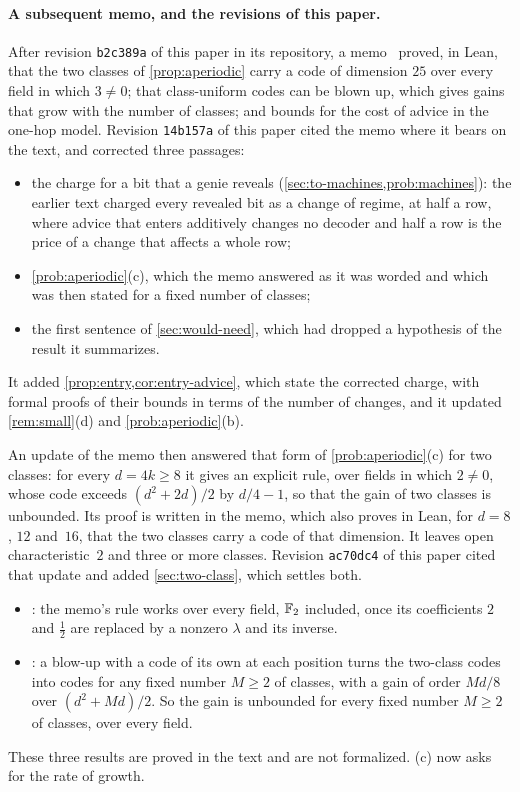 \paragraph{A subsequent memo, and the revisions of this paper.} After revision \texttt{b2c389a} of this paper in its
repository, a memo~\cite{ClassUniformMemo2026} proved, in Lean, that the two classes of \cref{prop:aperiodic} carry a
code of dimension $25$ over every field in which $3\ne0$; that class-uniform codes can be blown up, which gives gains
that grow with the number of classes; and bounds for the cost of advice in the one-hop model. Revision
\texttt{14b157a} of this paper cited the memo where it bears on the text, and corrected three passages:
\begin{itemize}[leftmargin=1.5em]
\item the charge for a bit that a genie reveals (\cref{sec:to-machines,prob:machines}): the earlier text charged every
revealed bit as a change of regime, at half a row, where advice that enters additively changes no decoder and half a
row is the price of a change that affects a whole row;
\item \cref{prob:aperiodic}(c), which the memo answered as it was worded and which was then stated for a fixed number
of classes;
\item the first sentence of \cref{sec:would-need}, which had dropped a hypothesis of the result it summarizes.
\end{itemize}
It added \cref{prop:entry,cor:entry-advice}, which state the corrected charge, with formal proofs of their bounds in
terms of the number of changes, and it updated \cref{rem:small}(d) and \cref{prob:aperiodic}(b).

An update of the memo then answered that form of \cref{prob:aperiodic}(c) for two classes: for every $d=4k\ge8$ it
gives an explicit rule, over fields in which $2\ne0$, whose code exceeds $(d^2+2d)/2$ by $d/4-1$, so that the gain of
two classes is unbounded. Its proof is written in the memo, which also proves in Lean, for $d=8$, $12$ and~$16$, that
the two classes carry a code of that dimension. It leaves open characteristic~$2$ and three or more classes.
Revision \texttt{ac70dc4} of this paper cited that update and added \cref{sec:two-class}, which settles both.
\begin{itemize}[leftmargin=1.5em]
\item {}: the memo's rule works over every field, $\mathbb{F}_2$ included, once its coefficients $2$ and
$\tfrac12$ are replaced by a nonzero $\lambda$ and its inverse.
\item {}: a blow-up with a code of its own at each position turns the two-class codes
into codes for any fixed number $M\ge2$ of classes, with a gain of order $Md/8$ over $(d^2+Md)/2$. So the gain is
unbounded for every fixed number $M\ge2$ of classes, over every field.
\end{itemize}
These three results are proved in the text and are not formalized. (c) now asks for the rate of
growth.

